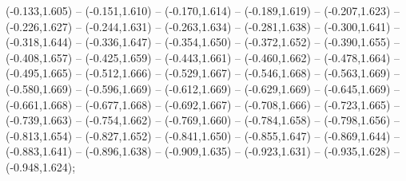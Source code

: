 (-0.133,1.605) -- (-0.151,1.610) -- (-0.170,1.614) -- (-0.189,1.619) -- (-0.207,1.623) -- (-0.226,1.627) -- (-0.244,1.631) -- (-0.263,1.634) -- (-0.281,1.638) -- (-0.300,1.641) -- (-0.318,1.644) -- (-0.336,1.647) -- (-0.354,1.650) -- (-0.372,1.652) -- (-0.390,1.655) -- (-0.408,1.657) -- (-0.425,1.659) -- (-0.443,1.661) -- (-0.460,1.662) -- (-0.478,1.664) -- (-0.495,1.665) -- (-0.512,1.666) -- (-0.529,1.667) -- (-0.546,1.668) -- (-0.563,1.669) -- (-0.580,1.669) -- (-0.596,1.669) -- (-0.612,1.669) -- (-0.629,1.669) -- (-0.645,1.669) -- (-0.661,1.668) -- (-0.677,1.668) -- (-0.692,1.667) -- (-0.708,1.666) -- (-0.723,1.665) -- (-0.739,1.663) -- (-0.754,1.662) -- (-0.769,1.660) -- (-0.784,1.658) -- (-0.798,1.656) -- (-0.813,1.654) -- (-0.827,1.652) -- (-0.841,1.650) -- (-0.855,1.647) -- (-0.869,1.644) -- (-0.883,1.641) -- (-0.896,1.638) -- (-0.909,1.635) -- (-0.923,1.631) -- (-0.935,1.628) -- (-0.948,1.624);
